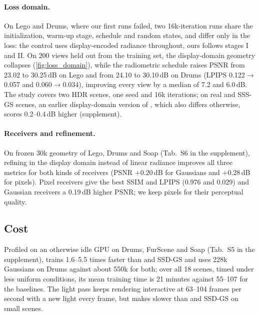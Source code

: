 \paragraph{Loss domain.}
On Lego and Drums, where our first runs failed, two 16k-iteration runs share the initialization, warm-up stage, schedule and random states, and differ only in the loss: the control uses display-encoded radiance throughout, ours follows stages I and II.
On 200 views held out from the training set, the display-domain geometry collapses (\cref{fig:loss_domain}), while the radiometric schedule raises PSNR from 23.02 to 30.25\,dB on Lego and from 24.10 to 30.10\,dB on Drums (LPIPS 0.122$\to$0.057 and 0.060$\to$0.034), improving every view by a median of 7.2 and 6.0\,dB.
The study covers two HDR scenes, one seed and 16k iterations; on real and SSS-GS scenes, an earlier display-domain version of \ours, which also differs otherwise, scores 0.2--0.4\,dB higher (supplement).

\paragraph{Receivers and refinement.}
On frozen 30k geometry of Lego, Drums and Soap (Tab.~S6 in the supplement), refining in the display domain instead of linear radiance improves all three metrics for both kinds of receivers (PSNR $+0.20$\,dB for Gaussians and $+0.28$\,dB for pixels).
Pixel receivers give the best SSIM and LPIPS (0.976 and 0.029) and Gaussian receivers a 0.19\,dB higher PSNR; we keep pixels for their perceptual quality.

\subsection{Cost}
\label{sec:exp_cost}
Profiled on an otherwise idle GPU on Drums, FurScene and Soap (Tab.~S5 in the supplement), \ours trains 1.6--5.5 times faster than \gsthree and SSD-GS and uses 228k Gaussians on Drums against about 550k for both; over all 18 scenes, timed under less uniform conditions, its mean training time is 21 minutes against 55--107 for the baselines.
The light pass keeps rendering interactive at 63--104 frames per second with a new light every frame, but makes \ours slower than \gsthree and SSD-GS on small scenes.

